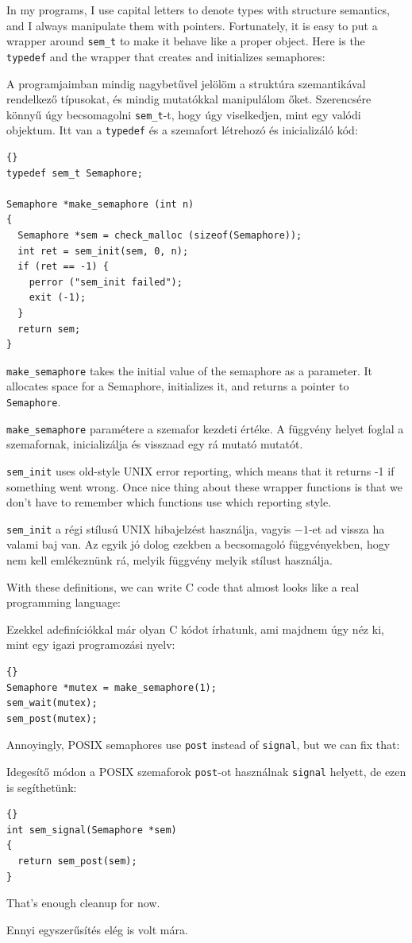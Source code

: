 \documentclass{book}
\begin{document}
In my programs, I use capital letters to denote types with
structure semantics, and I always manipulate them with pointers.
Fortunately, it is easy to put a wrapper around {\tt sem\_t}
to make it behave like a proper object.  Here is the 
{\tt typedef} and the wrapper that creates and initializes
semaphores:

A programjaimban mindig nagybetűvel jelölöm a struktúra
szemantikával rendelkező típusokat, és mindig mutatókkal
manipulálom őket. Szerencsére könnyű úgy becsomagolni
{\tt sem\_t}-t, hogy úgy viselkedjen, mint egy valódi objektum.
Itt van a {\tt typedef} és a szemafort létrehozó és inicializáló kód:

\begin{lstlisting}[title={}]{}
typedef sem_t Semaphore;

Semaphore *make_semaphore (int n)
{
  Semaphore *sem = check_malloc (sizeof(Semaphore));
  int ret = sem_init(sem, 0, n);
  if (ret == -1) {
    perror ("sem_init failed");
    exit (-1);    
  }
  return sem;
}
\end{lstlisting}

{\tt make\_semaphore} takes the initial value of the semaphore
as a parameter.  It allocates space for a Semaphore, initializes
it, and returns a pointer to {\tt Semaphore}.

{\tt make\_semaphore} paramétere a szemafor kezdeti értéke.
A függvény helyet foglal a szemafornak, inicializálja
és visszaad egy rá mutató mutatót.

{\tt sem\_init} uses old-style UNIX error reporting, which means
that it returns -1 if something went wrong.  Once nice thing
about these wrapper functions is that we don't have to remember
which functions use which reporting style.

{\tt sem\_init} a régi stílusú UNIX hibajelzést használja, vagyis
$-1$-et ad vissza ha valami baj van. Az egyik jó dolog ezekben a
becsomagoló függvényekben, hogy nem kell emlékeznünk rá,
melyik függvény melyik stílust használja.

With these definitions, we can write C code that almost looks
like a real programming language:

Ezekkel adefiníciókkal már olyan C kódot írhatunk, ami
majdnem úgy néz ki, mint egy igazi programozási nyelv:

\begin{lstlisting}[title={}]{}
Semaphore *mutex = make_semaphore(1);
sem_wait(mutex);
sem_post(mutex);
\end{lstlisting}

Annoyingly, POSIX semaphores use {\tt post} instead of
{\tt signal}, but we can fix that:

Idegesítő módon a POSIX szemaforok {\tt post}-ot használnak
{\tt signal} helyett, de ezen is segíthetünk:

\begin{lstlisting}[title={}]{}
int sem_signal(Semaphore *sem)
{
  return sem_post(sem);
}
\end{lstlisting}

That's enough cleanup for now.

Ennyi egyszerűsítés elég is volt mára.
\end{document}

